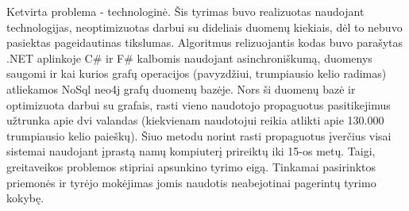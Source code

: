 \documentclass{VUMIFInfMagistrinis}
\begin{document}
Ketvirta problema - technologinė. Šis tyrimas buvo realizuotas naudojant technologijas, neoptimizuotas darbui su dideliais duomenų kiekiais, dėl to nebuvo pasiektas pageidautinas tikslumas. Algoritmus relizuojantis kodas buvo parašytas .NET aplinkoje C\# ir F\# kalbomis naudojant asinchroniškumą, duomenys saugomi ir kai kurios grafų operacijos (pavyzdžiui, trumpiausio kelio radimas) atliekamos NoSql neo4j grafų duomenų bazėje. Nors ši duomenų bazė ir optimizuota darbui su grafais, rasti vieno naudotojo propaguotus pasitikejimus užtrunka apie dvi valandas (kiekvienam naudotojui reikia atlikti apie 130.000 trumpiausio kelio paieškų). Šiuo metodu norint rasti propaguotus įverčius visai sistemai naudojant įprastą namų kompiuterį prireiktų iki 15-os metų. Taigi, greitaveikos problemos stipriai apsunkino tyrimo eigą. Tinkamai pasirinktos priemonės ir tyrėjo mokėjimas jomis naudotis neabejotinai pagerintų tyrimo kokybę.
\end{document}
